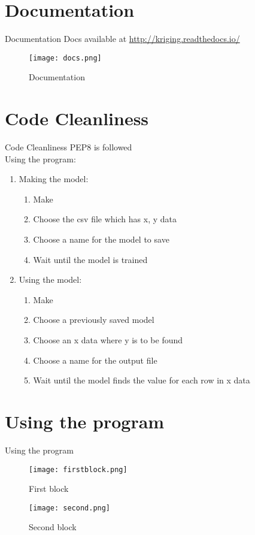 \documentclass{beamer}
\begin{document}
\section{Documentation}
\begin{frame}{Documentation}
Docs available at \url{http://kriging.readthedocs.io/}
\begin{figure}[H]
	\texttt{[image: docs.png]}
	\caption{Documentation}
\end{figure}

\end{frame}


\section{Code Cleanliness}
\begin{frame}{Code Cleanliness}
\justifying
PEP8 is followed \\
Using the program:
\begin{enumerate}
	\item Making the model:
\begin{enumerate}
	\item Make
	\item Choose the csv file which has x, y data
	\item Choose a name for the model to save
	\item Wait until the model is trained
\end{enumerate}
	\item Using the model:
\begin{enumerate}
	\item Make
	\item Choose a previously saved model
	\item Choose an x data where y is to be found
	\item Choose a name for the output file
	\item Wait until the model finds the value for each row in x data
\end{enumerate}
\end{enumerate}
\end{frame}

\section{Using the program}

\begin{frame}{Using the program}
\begin{figure}[H]
	\texttt{[image: firstblock.png]}
	\caption{First block}
\end{figure}
\begin{figure}[H]
	\texttt{[image: second.png]}
	\caption{Second block}
\end{figure}
\end{frame}
\end{document}
